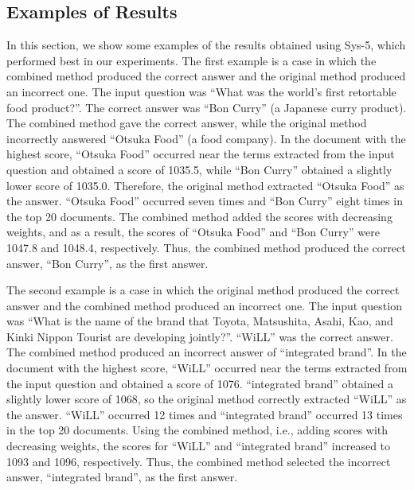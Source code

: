 \subsection{Examples of Results}

In this section, we show some examples of the results 
obtained using Sys-5, which performed best in our experiments. 
The first example is a case in which 
the combined method produced the correct answer and 
the original method produced an incorrect one.
The input question was
``What was the world's first retortable food product?''. 
The correct answer was ``Bon Curry'' (a Japanese curry product).
The combined method gave the correct answer, while
the original method incorrectly answered ``Otsuka Food'' (a food company). 
In the document with the highest score, 
``Otsuka Food'' occurred near the terms extracted from the input question 
and obtained a score of 1035.5, while
``Bon Curry'' obtained a slightly lower score of 1035.0.
Therefore, the original method extracted 
``Otsuka Food'' as the answer.
``Otsuka Food'' occurred seven times and 
``Bon Curry'' eight times in the top 20 documents. 
The combined method added the scores with decreasing weights, and as a result, 
the scores of ``Otsuka Food'' and ``Bon Curry'' were 1047.8
and 1048.4, respectively. 
Thus, the combined method produced the correct answer, ``Bon Curry'', as the first answer. 

The second example is a case in which 
the original method produced the correct answer and
the combined method produced an incorrect one.
The input question was ``What is the name of the brand that Toyota, Matsushita,
Asahi, Kao, and Kinki Nippon Tourist are developing jointly?''. 
``WiLL'' was the correct answer. 
The combined method produced an incorrect answer of ``integrated brand''. 
In the document with the highest score, 
``WiLL'' occurred near the terms extracted from the input question 
and obtained a score of 1076. 
``integrated brand'' obtained a slightly lower score of 1068, 
so the original method correctly extracted ``WiLL'' as the answer. 
``WiLL'' occurred 12 times and 
``integrated brand'' occurred 13 times in the top 20 documents. 
Using the combined method, 
i.e., adding scores with decreasing weights, 
the scores for ``WiLL'' and ``integrated brand'' increased to 1093 
and 1096, respectively.
Thus, the combined method selected the incorrect answer, ``integrated brand'', as the first answer. 

